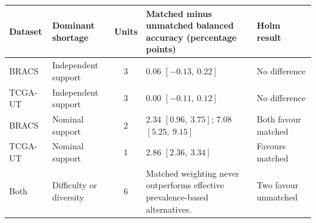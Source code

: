 \begin{tabularx}{\textwidth}{@{}l l c X l@{}}
\toprule
Dataset & Dominant shortage & Units & Matched minus unmatched balanced accuracy (percentage points) & Holm result \\
\midrule
BRACS & Independent support & 3 & \num{0.06} $[-\num{0.13},\ \num{0.22}]$ & No difference \\
TCGA-UT & Independent support & 3 & \num{0.00} $[-\num{0.11},\ \num{0.12}]$ & No difference \\
BRACS & Nominal support & 2 & \num{2.34} $[\num{0.96},\ \num{3.75}]$; \num{7.08} $[\num{5.25},\ \num{9.15}]$ & Both favour matched \\
TCGA-UT & Nominal support & 1 & \num{2.86} $[\num{2.36},\ \num{3.34}]$ & Favours matched \\
Both & Difficulty or diversity & 6 & Matched weighting never outperforms effective prevalence-based alternatives. & Two favour unmatched \\
\bottomrule
\end{tabularx}
